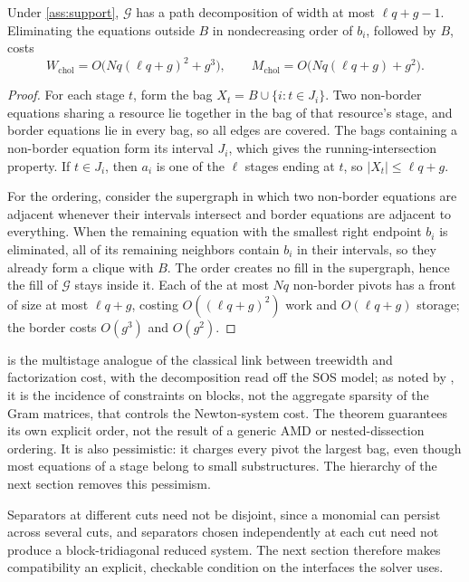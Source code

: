 \begin{theorem}\label{thm:interval}
Under \cref{ass:support}, $\mathcal G$ has a path decomposition of width at most
$\ell q+g-1$. Eliminating the equations outside $B$ in nondecreasing order of
$b_i$, followed by $B$, costs
\begin{equation}\label{eq:interval-cost}
W_{\mathrm{chol}}=O\bigl(Nq(\ell q+g)^2+g^3\bigr),\qquad
M_{\mathrm{chol}}=O\bigl(Nq(\ell q+g)+g^2\bigr).
\end{equation}
\end{theorem}

\begin{proof}
For each stage $t$, form the bag $X_t=B\cup\{i:t\in J_i\}$. Two non-border
equations sharing a resource lie together in the bag of that resource's stage, and
border equations lie in every bag, so all edges are covered. The bags containing a
non-border equation form its interval $J_i$, which gives the running-intersection
property. If $t\in J_i$, then $a_i$ is one of the $\ell$ stages ending at $t$, so
$|X_t|\le\ell q+g$.

For the ordering, consider the supergraph in which two non-border equations are
adjacent whenever their intervals intersect and border equations are adjacent to
everything. When the remaining equation with the smallest right endpoint $b_i$ is
eliminated, all of its remaining neighbors contain $b_i$ in their intervals, so
they already form a clique with $B$. The order creates no fill in the supergraph,
hence the fill of $\mathcal G$ stays inside it. Each of the at most $Nq$
non-border pivots has a front of size at most $\ell q+g$, costing
$O((\ell q+g)^2)$ work and $O(\ell q+g)$ storage; the border costs $O(g^3)$ and
$O(g^2)$.
\end{proof}

 is the multistage analogue of the classical link between
treewidth and factorization cost, with the decomposition read off the SOS model;
as noted by \citet{zhang2024chordal}, it is the incidence of constraints on
blocks, not the aggregate sparsity of the Gram matrices, that controls the
Newton-system cost. The theorem guarantees its own explicit order, not the result
of a generic AMD or nested-dissection ordering. It is also pessimistic: it charges
every pivot the largest bag, even though most equations of a stage belong to small
substructures. The hierarchy of the next section removes this pessimism.

Separators at different cuts need not be disjoint, since a monomial can persist
across several cuts, and separators chosen independently at each cut need not
produce a block-tridiagonal reduced system. The next section therefore makes
compatibility an explicit, checkable condition on the interfaces the solver uses.
